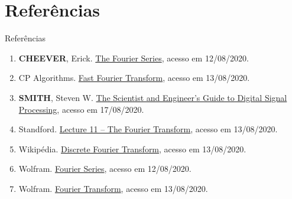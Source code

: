 \section{Referências}

\begin{frame}[fragile]{Referências}

    \begin{enumerate}
        \item \textbf{CHEEVER}, Erick. \href{https://lpsa.swarthmore.edu/Fourier/Series/WhyFS.html}
            {The Fourier Series}, acesso em 12/08/2020.

        \item CP Algorithms. \href{https://cp-algorithms.com/algebra/fft.html}{Fast Fourier
            Transform}, acesso em 13/08/2020.
 
        \item \textbf{SMITH}, Steven W. \href{https://www.dspguide.com/ch12/2.htm}{The Scientist
            and Engineer's Guide to Digital Signal Processing}, acesso em 17/08/2020.
 
        \item Standford. \href{https://web.stanford.edu/class/ee102/lectures/fourtran}{Lecture 11
            -- The Fourier Transform}, acesso em 13/08/2020.

        \item Wikipédia. \href{https://en.wikipedia.org/wiki/Discrete_Fourier_transform}{Discrete
            Fourier Transform}, acesso em 13/08/2020.
 
        \item Wolfram. \href{https://mathworld.wolfram.com/FourierSeries.html}{Fourier Series},
            acesso em 12/08/2020.

        \item Wolfram. \href{https://mathworld.wolfram.com/FourierTransform.html}{Fourier
            Transform}, acesso em 13/08/2020.
 
    \end{enumerate}

\end{frame}
